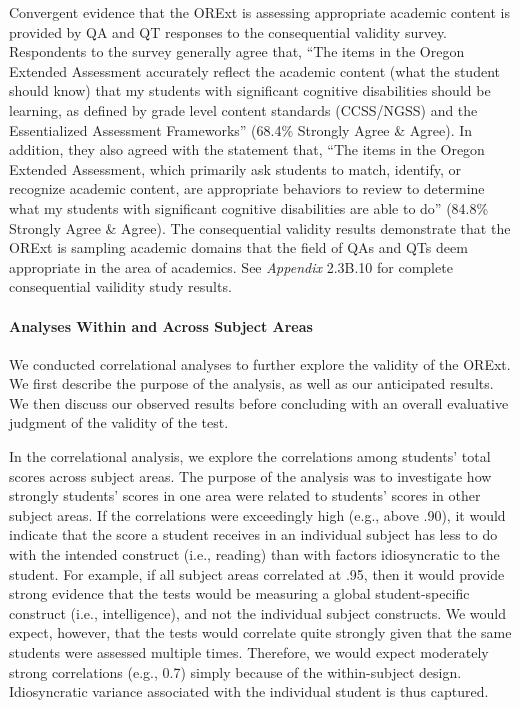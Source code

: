 \documentclass[]{article}
\let\oldparagraph\paragraph
\renewcommand{\paragraph}[1]{\oldparagraph{#1}\mbox{}}
\begin{document}
Convergent evidence that the ORExt is assessing appropriate academic
content is provided by QA and QT responses to the consequential validity
survey. Respondents to the survey generally agree that, ``The items in
the Oregon Extended Assessment accurately reflect the academic content
(what the student should know) that my students with significant
cognitive disabilities should be learning, as defined by grade level
content standards (CCSS/NGSS) and the Essentialized Assessment
Frameworks'' (68.4\% Strongly Agree \& Agree). In addition, they also
agreed with the statement that, ``The items in the Oregon Extended
Assessment, which primarily ask students to match, identify, or
recognize academic content, are appropriate behaviors to review to
determine what my students with significant cognitive disabilities are
able to do'' (84.8\% Strongly Agree \& Agree). The consequential
validity results demonstrate that the ORExt is sampling academic domains
that the field of QAs and QTs deem appropriate in the area of academics.
See \emph{Appendix} 2.3B.10 for complete consequential vailidity study
results.

\paragraph{Analyses Within and Across Subject
Areas}\label{analyses-within-and-across-subject-areas}

We conducted correlational analyses to further explore the validity of
the ORExt. We first describe the purpose of the analysis, as well as our
anticipated results. We then discuss our observed results before
concluding with an overall evaluative judgment of the validity of the
test.

In the correlational analysis, we explore the correlations among
students' total scores across subject areas. The purpose of the analysis
was to investigate how strongly students' scores in one area were
related to students' scores in other subject areas. If the correlations
were exceedingly high (e.g., above .90), it would indicate that the
score a student receives in an individual subject has less to do with
the intended construct (i.e., reading) than with factors idiosyncratic
to the student. For example, if all subject areas correlated at .95,
then it would provide strong evidence that the tests would be measuring
a global student-specific construct (i.e., intelligence), and not the
individual subject constructs. We would expect, however, that the tests
would correlate quite strongly given that the same students were
assessed multiple times. Therefore, we would expect moderately strong
correlations (e.g., 0.7) simply because of the within-subject design.
Idiosyncratic variance associated with the individual student is thus
captured.
\end{document}

